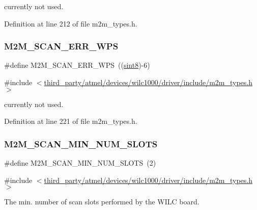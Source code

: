 currently not used. 

Definition at line 212 of file m2m\+\_\+types.\+h.

\mbox{\label{group__WlanDefines_ga46a2ed245a4ee742b0c9dcdf26825025}} 
\subsubsection{\texorpdfstring{M2\+M\+\_\+\+S\+C\+A\+N\+\_\+\+E\+R\+R\+\_\+\+W\+PS}{M2M\_SCAN\_ERR\_WPS}}
{\footnotesize\ttfamily \#define M2\+M\+\_\+\+S\+C\+A\+N\+\_\+\+E\+R\+R\+\_\+\+W\+PS~((\hyperlink{group__DataT_gae35f10ffd0ac8dd2bc3e794da9bdfbc7}{sint8})-\/6)}



{\ttfamily \#include $<$\hyperlink{m2m__types_8h}{third\+\_\+party/atmel/devices/wilc1000/driver/include/m2m\+\_\+types.\+h}$>$}

currently not used. 

Definition at line 221 of file m2m\+\_\+types.\+h.

\mbox{\label{group__WlanDefines_gac12991014d0b3fa80110e85b07235e4d}} 
\subsubsection{\texorpdfstring{M2\+M\+\_\+\+S\+C\+A\+N\+\_\+\+M\+I\+N\+\_\+\+N\+U\+M\+\_\+\+S\+L\+O\+TS}{M2M\_SCAN\_MIN\_NUM\_SLOTS}}
{\footnotesize\ttfamily \#define M2\+M\+\_\+\+S\+C\+A\+N\+\_\+\+M\+I\+N\+\_\+\+N\+U\+M\+\_\+\+S\+L\+O\+TS~(2)}



{\ttfamily \#include $<$\hyperlink{m2m__types_8h}{third\+\_\+party/atmel/devices/wilc1000/driver/include/m2m\+\_\+types.\+h}$>$}

The min. number of scan slots performed by the W\+I\+LC board. 

